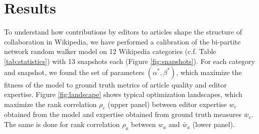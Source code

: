 \section{Results}
To understand how contributions by editors to articles shape the structure of collaboration in Wikipedia, we have performed a calibration of the bi-partite network random walker model on 12 Wikipedia categories (c.f. Table \ref{tab:statistics}) with 13 snapshots each (Figure \ref{fig:snapshots}). For each category and snapshot, we found the set of parameters $(\alpha^*,\beta^*)$, which maximize the fitness of the model to ground truth metrics of article quality and editor expertise. Figure \ref{fig:landscape} shows typical optimization landscapes, which maximize the rank correlation $\rho_e$ (upper panel) between editor expertise $w_{e}$ obtained from the model and expertise obtained from ground truth measures $\bar{w}_e$. The same is done for rank correlation $\rho_a$ between $w_a$ and $\bar{w}_a$ (lower panel). 

